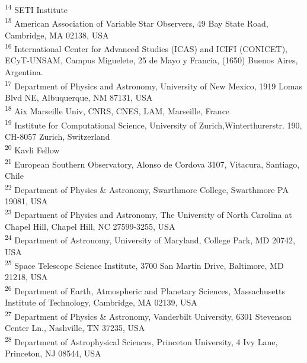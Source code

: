 \documentclass[fleqn,usenatbib]{mnras}
\begin{document}
\textsuperscript{\hypertarget{affil_14}{14}} SETI Institute\\
\textsuperscript{\hypertarget{affil_15}{15}} American Association of Variable Star Observers, 49 Bay State Road, Cambridge, MA 02138, USA\\
\textsuperscript{\hypertarget{affil_16}{16}} International Center for Advanced Studies (ICAS) and ICIFI (CONICET), ECyT-UNSAM, Campus Miguelete, 25 de Mayo y Francia, (1650) Buenos Aires, Argentina.\\
\textsuperscript{\hypertarget{affil_17}{17}} Department of Physics and Astronomy, University of New Mexico, 1919 Lomas Blvd NE, Albuquerque, NM 87131, USA\\
\textsuperscript{\hypertarget{affil_18}{18}} Aix Marseille Univ, CNRS, CNES, LAM, Marseille, France\\
\textsuperscript{\hypertarget{affil_19}{19}} Institute for Computational Science, University of Zurich,Winterthurerstr. 190, CH-8057 Zurich, Switzerland\\
\textsuperscript{\hypertarget{affil_20}{20}} Kavli Fellow\\
\textsuperscript{\hypertarget{affil_21}{21}} European Southern Observatory, Alonso de Cordova 3107, Vitacura, Santiago, Chile\\
\textsuperscript{\hypertarget{affil_22}{22}} Department of Physics \& Astronomy, Swarthmore College, Swarthmore PA 19081, USA\\
\textsuperscript{\hypertarget{affil_23}{23}} Department of Physics and Astronomy, The University of North Carolina at Chapel Hill, Chapel Hill, NC 27599-3255, USA\\
\textsuperscript{\hypertarget{affil_24}{24}} Department of Astronomy, University of Maryland, College Park, MD 20742, USA\\
\textsuperscript{\hypertarget{affil_25}{25}} Space Telescope Science Institute, 3700 San Martin Drive, Baltimore, MD 21218, USA\\
\textsuperscript{\hypertarget{affil_26}{26}} Department of Earth, Atmospheric and Planetary Sciences, Massachusetts Institute of Technology, Cambridge, MA 02139, USA\\
\textsuperscript{\hypertarget{affil_27}{27}} Department of Physics \& Astronomy, Vanderbilt University, 6301 Stevenson Center Ln., Nashville, TN 37235, USA\\
\textsuperscript{\hypertarget{affil_28}{28}} Department of Astrophysical Sciences, Princeton University, 4 Ivy Lane, Princeton, NJ 08544, USA\\
\end{document}
